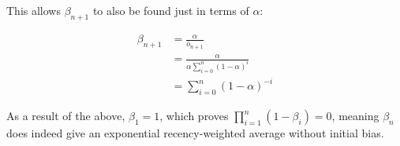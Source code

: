 This allows $\beta_{n+1}$ to also be found just in terms of $\alpha$:

\vspace{-6mm}
\begin{align*}
\beta_{n+1} &= \frac{\alpha}{\bar{o}_{n+1}} \\
&= \frac{\alpha}{\alpha\sum_{i=0}^{n}(1-\alpha)^i} \\
&= \sum_{i=0}^{n}(1-\alpha)^{-i}
\end{align*}

As a result of the above, $\beta_1 = 1$, which proves $\prod_{i=1}^{n}(1-\beta_i) = 0$, meaning $\beta_n$ does indeed give an exponential recency-weighted average without initial bias.
